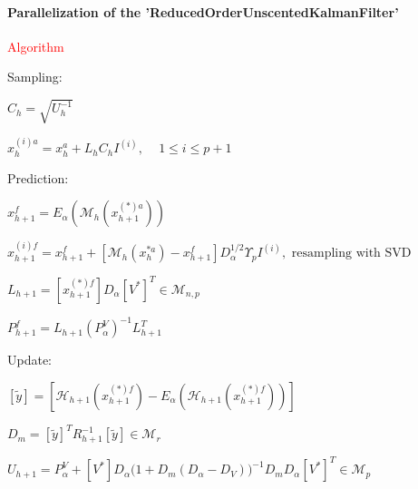 \documentclass{tufte-book}
\begin{document}
\hypertarget{par-seq-algo-roukf}{}\paragraph{Parallelization of the 'ReducedOrderUnscentedKalmanFilter'}\label{par-seq-algo-roukf}

  \par \textcolor{red}{Algorithm}\\


  \begin{DoxyEnumerate}
\item \-Sampling\-:
\begin{DoxyItemize}
\item $ C_{h} = \sqrt{U_h^{-1}} $\par

\item $ x_{h}^{(i)a} = x_h^a + L_hC_hI^{(i)} \textrm{, } \quad 1\leq i \leq p+1 $\par

\end{DoxyItemize}
\item \-Prediction\-:
\begin{DoxyItemize}
\item $ x_{h+1}^f = E_\alpha(\mathcal{M}_{h}(x_{h+1}^{(*)a})) $\par

\item $ x_{h+1}^{(i)f} = x_{h+1}^f + [\mathcal{M}_{h}(x_{h}^{*a}) - x_{h+1}^f]D_{\alpha}^{1/2} \Upsilon_p I^(i), \textrm{ resampling with SVD} $\par

\item $ L_{h+1} = [x_{h+1}^{(*)f}]D_\alpha [V^*]^T \in \mathcal{M}_{n,p} $\par

\item $ P_{h+1}^f = L_{h+1} (P_{\alpha}^V)^{-1} L_{h+1}^T $
\end{DoxyItemize}
\item \-Update\-:
\begin{DoxyItemize}
\item $ [\tilde{y}] = [\mathcal{H}_{h+1}(x_{h+1}^{(*)f}) - E_\alpha(\mathcal{H}_{h+1}(x_{h+1}^{(*)f})) ]$\par

\item $ D_m = [\tilde{y}]^T R_{h+1}^{-1}[\tilde{y}] \in \mathcal{M}_r $\par

\item $ U_{h+1} = P_{\alpha}^V + [V^*] D_\alpha \bigl(1 + D_m(D_\alpha - D_V)\bigr)^{-1} D_m D_\alpha [V^*]^T \in \mathcal{M}_{p} $\par


\end{DoxyItemize}
\end{DoxyEnumerate}
\end{document}

